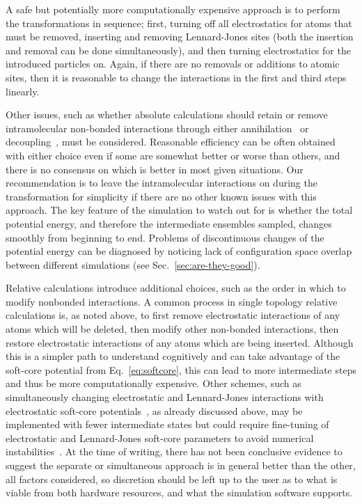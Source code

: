 \documentclass[9pt,bestpractices]{livecoms}
\begin{document}
A safe but potentially more computationally expensive approach is to perform the transformations in sequence; first, turning off all electrostatics for atoms that must be removed, inserting and removing Lennard-Jones sites (both the insertion and removal can be done simultaneously), and then turning electrostatics for the introduced particles on. Again, if there are no removals or additions to atomic sites, then it is reasonable to change the interactions in the first and third steps  linearly. 

Other issues, such as whether absolute calculations should retain or remove intramolecular non-bonded interactions
through either annihilation~\cite{hermans1997inclusion, mann2000modeling, boresch2003absolute, wang2006absolute, mobley2006use} or decoupling~\cite{fujitani2005direct, mobley2006use}, must be considered. Reasonable efficiency can be often obtained with either choice even if some are somewhat better or worse than others, and there is no consensus on which is better in most given situations. Our recommendation is to leave the intramolecular interactions on during the transformation for simplicity if there are no other known issues with this approach. The key feature of the simulation to watch out for is whether the total potential energy, and therefore the intermediate ensembles sampled, changes smoothly from beginning to end. Problems of discontinuous changes of the potential energy can be diagnosed by noticing lack of configuration space overlap between different simulations (see Sec.~\ref{sec:are-they-good}).

Relative calculations introduce additional choices, such as the order in which to modify nonbonded interactions.
A common process in single topology relative calculations is, as noted above, to first remove electrostatic interactions of any atoms which will be deleted, then modify other non-bonded interactions, then restore electrostatic interactions of any atoms which are being inserted. Although this is a simpler path to understand cognitively and can take advantage of the soft-core potential from Eq.~\ref{eq:softcore}, this can lead to more intermediate steps and thus be more computationally expensive.
Other schemes, such as simultaneously changing electrostatic and Lennard-Jones interactions with electrostatic soft-core potentials~\cite{steinbrecher2007nonlinear}, as already discussed above, may be implemented with fewer intermediate states but could require fine-tuning of electrostatic and Lennard-Jones soft-core parameters to avoid numerical instabilities~\cite{Tsai_JChemTheoryComput_2023_v19_p640}. 
At the time of writing, there has not been conclusive evidence to suggest the separate or simultaneous approach is in general better than the other, all factors considered, so discretion should be left up to the user as to what is viable from both hardware resources, and what the simulation software supports.
\end{document}
